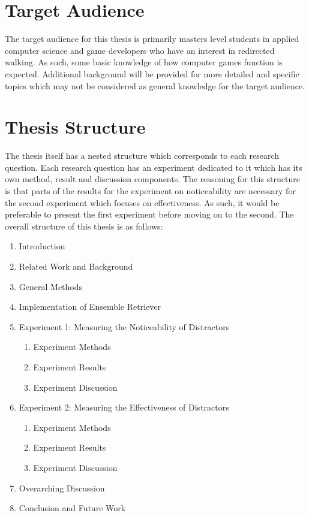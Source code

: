 \section{Target Audience}
The target audience for this thesis is primarily masters level students in applied computer science and game developers who have an interest in redirected walking. As such, some basic knowledge of how computer games function is expected. Additional background will be provided for more detailed and specific topics which may not be considered as general knowledge for the target audience. 

\section{Thesis Structure}
The thesis itself has a nested structure which corresponds to each research question. Each research question has an experiment dedicated to it which has its own method, result and discussion components. The reasoning for this structure is that parts of the results for the experiment on noticeability are necessary for the second experiment which focuses on effectiveness. As such, it would be preferable to present the first experiment before moving on to the second. The overall structure of this thesis is as follows:

\begin{enumerate}
    \item Introduction
    \item Related Work and Background
    \item General Methods
    \item Implementation of Ensemble Retriever
    \item Experiment 1: Measuring the Noticeability of Distractors
    \begin{enumerate}
        \item Experiment Methods
        \item Experiment Results
        \item Experiment Discussion
    \end{enumerate}
    \item Experiment 2: Measuring the Effectiveness of Distractors
    \begin{enumerate}
        \item Experiment Methods
        \item Experiment Results
        \item Experiment Discussion
    \end{enumerate}
    \item Overarching Discussion
    \item Conclusion and Future Work
\end{enumerate}
